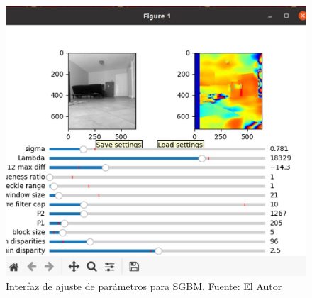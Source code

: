 \begin{figure}[H]
    \centering
    \includegraphics[scale=0.5]{Recursos/tuner_interface.jpg}
    \caption[Interfaz de ajuste de parámetros para SGBM.]{Interfaz de ajuste de parámetros para SGBM. {\footnotesize Fuente: El Autor}}
    \label{tuner}
\end{figure}